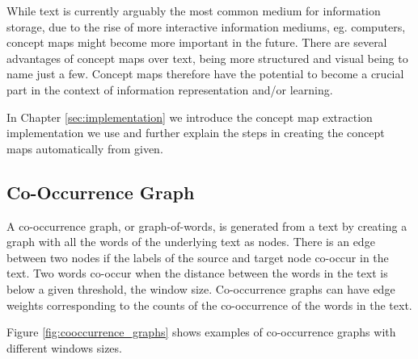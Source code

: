 While text is currently arguably the most common medium for information storage, due to the rise of more interactive information mediums, eg. computers, concept maps might become more important in the future.
There are several advantages of concept maps over text, being more structured and visual being to name just a few.
Concept maps therefore have the potential to become a crucial part in the context of information representation and/or learning.

In Chapter \ref{sec:implementation} we introduce the concept map extraction implementation we use and further explain the steps in creating the concept maps automatically from given.

\subsection{Co-Occurrence Graph}
A co-occurrence graph, or graph-of-words, is generated from a text by creating a graph with all the words of the underlying text as nodes.
There is an edge between two nodes if the labels of the source and target node co-occur in the text.
Two words co-occur when the distance between the words in the text is below a given threshold, the window size.
Co-occurrence graphs can have edge weights corresponding to the counts of the co-occurrence of the words in the text.

Figure \ref{fig:cooccurrence_graphs} shows examples of co-occurrence graphs with different windows sizes.

